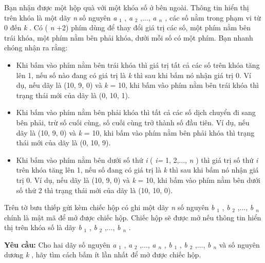 Bạn nhận được một hộp quà với một khóa số ở bên ngoài. Thông tin hiển thị trên khóa là một dãy \emph{ n } số nguyên \emph{ a }$_ 1 $ , \emph{ a }$_ 2 $ ,..., \emph{ a $_ n $ , } các số nằm trong phạm vi từ 0 đến \emph{ k } . Có ( \emph{ n } +2) phím dùng để thay đổi giá trị các số, một phím nằm bên trái khóa, một phím nằm bên phải khóa, dưới mỗi số có một phím. Bạn nhanh chóng nhận ra rằng:
\begin{itemize}
	\item Khi bấm vào phím nằm bên trái khóa thì giá trị tất cả các số trên khóa tăng lên 1, nếu số nào đang có giá trị là \emph{ k } thì sau khi bấm nó nhận giá trị 0. Ví dụ, nếu dãy là (10, 9, 0) và \emph{ k } = 10, khi bấm vào phím nằm bên trái khóa thì trạng thái mới của dãy là (0, 10, 1).
	\item Khi bấm vào phím nằm bên phải khóa thì tất cả các số dịch chuyển đi sang bên phải, trừ số cuối cùng, số cuối cùng trở thành số đầu tiên. Ví dụ, nếu dãy là (10, 9, 0) và \emph{ k } = 10, khi bấm vào phím nằm bên phải khóa thì trạng thái mới của dãy là (0, 10, 9).
	\item Khi bấm vào phím nằm bên dưới số thứ \emph{ i } ( \emph{ i= } 1, 2,..., \emph{ n } ) thì giá trị số thứ \emph{ i } trên khóa tăng lên 1, nếu số đang có giá trị là \emph{ k } thì sau khi bấm nó nhận giá trị 0. Ví dụ, nếu dãy là (10, 9, 0) và \emph{ k } = 10, khi bấm vào phím nằm bên dưới số thứ 2 thì trạng thái mới của dãy là (10, 10, 0).
\end{itemize}

Trên tờ bưu thiếp gửi kèm chiếc hộp có ghi một dãy \emph{ n } số nguyên \emph{ b }$_ 1 $ , \emph{ b }$_ 2 $ ,..., \emph{ b $_ n $} chính là mật mã để mở được chiếc hộp. Chiếc hộp sẽ được mở nếu thông tin hiển thị trên khóa số là dãy \emph{ b }$_ 1 $ , \emph{ b }$_ 2 $ ,..., \emph{ b $_ n $} .

\textbf{Yêu cầu: } Cho hai dãy số nguyên \emph{ a }$_ 1 $ , \emph{ a }$_ 2 $ ,..., \emph{ a $_ n $} , \emph{ b }$_ 1 $ , \emph{ b }$_ 2 $ ,..., \emph{ b $_ n $} và số nguyên dương \emph{ k } , hãy tìm cách bấm ít lần nhất để mở được chiếc hộp.